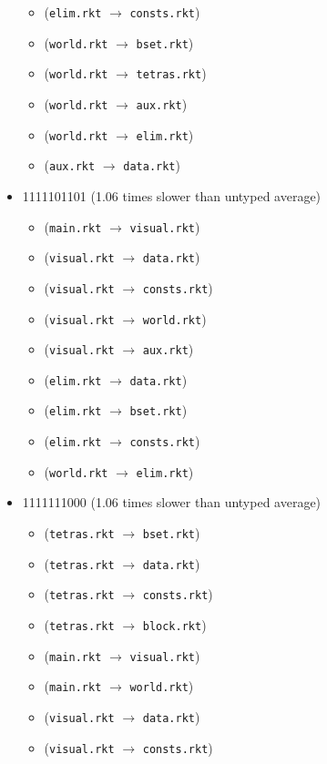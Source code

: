 \documentclass{article}
\newcommand{\mono}[1]{\texttt{#1}}
\begin{document}
\begin{itemize}
\begin{itemize}
  \item (\mono{elim.rkt} $\rightarrow$ \mono{consts.rkt})
  \item (\mono{world.rkt} $\rightarrow$ \mono{bset.rkt})
  \item (\mono{world.rkt} $\rightarrow$ \mono{tetras.rkt})
  \item (\mono{world.rkt} $\rightarrow$ \mono{aux.rkt})
  \item (\mono{world.rkt} $\rightarrow$ \mono{elim.rkt})
  \item (\mono{aux.rkt} $\rightarrow$ \mono{data.rkt})
  \end{itemize}
\item 1111101101 (1.06 times slower than untyped average)
  \begin{itemize}
  \item (\mono{main.rkt} $\rightarrow$ \mono{visual.rkt})
  \item (\mono{visual.rkt} $\rightarrow$ \mono{data.rkt})
  \item (\mono{visual.rkt} $\rightarrow$ \mono{consts.rkt})
  \item (\mono{visual.rkt} $\rightarrow$ \mono{world.rkt})
  \item (\mono{visual.rkt} $\rightarrow$ \mono{aux.rkt})
  \item (\mono{elim.rkt} $\rightarrow$ \mono{data.rkt})
  \item (\mono{elim.rkt} $\rightarrow$ \mono{bset.rkt})
  \item (\mono{elim.rkt} $\rightarrow$ \mono{consts.rkt})
  \item (\mono{world.rkt} $\rightarrow$ \mono{elim.rkt})
  \end{itemize}
\item 1111111000 (1.06 times slower than untyped average)
  \begin{itemize}
  \item (\mono{tetras.rkt} $\rightarrow$ \mono{bset.rkt})
  \item (\mono{tetras.rkt} $\rightarrow$ \mono{data.rkt})
  \item (\mono{tetras.rkt} $\rightarrow$ \mono{consts.rkt})
  \item (\mono{tetras.rkt} $\rightarrow$ \mono{block.rkt})
  \item (\mono{main.rkt} $\rightarrow$ \mono{visual.rkt})
  \item (\mono{main.rkt} $\rightarrow$ \mono{world.rkt})
  \item (\mono{visual.rkt} $\rightarrow$ \mono{data.rkt})
  \item (\mono{visual.rkt} $\rightarrow$ \mono{consts.rkt})

\end{itemize}
\end{itemize}
\end{document}
